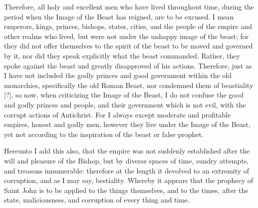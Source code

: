 Therefore, all holy and excellent men who have lived throughout time, during the period when the Image of the Beast has reigned, are to be excused. I mean emperors, kings, princes, bishops, states, cities, and the people of the empire and other realms who lived, but were not under the unhappy image of the beast; for they did not offer themselves to the spirit of the beast to be moved and governed by it, nor did they speak explicitly what the beast commanded. Rather, they spoke against the beast and greatly disapproved of his actions. Therefore, just as I have not included the godly princes and good government within the old monarchies, specifically the old Roman Beast, nor condemned them of beastiality [?], so now, when criticizing the Image of the Beast, I do not confuse the good and godly princes and people, and their government which is not evil, with the corrupt actions of Antichrist. For I always except moderate and profitable empires, honest and godly men, however they live under the Image of the Beast, yet not according to the inspiration of the beast or false prophet.

Hereunto I add this also, that the empire was not suddenly established after the will and pleasure of the Bishop, but by diverse spaces of time, sundry attempts, and treasons innumerable: therefore at the length it devolved to an extremity of corruption, and as I may say, bestiality. Whereby it appears that the prophecy of Saint John is to be applied to the things themselves, and to the times, after the state, maliciousness, and corruption of every thing and time.

